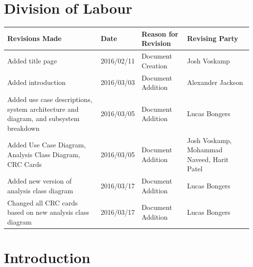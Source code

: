 \documentclass[]{article}
\begin{document}
\section*{Division of Labour}
\label{sec:division_of_labour}
\begin{table}[H]
	\centering
	\begin{tabular}{|p{5cm}|p{2cm}|p{3.5cm}|p{3cm}|}\hline
	    \textbf{Revisions Made} & \textbf{Date} & \textbf{Reason for Revision} & \textbf{Revising Party}\\\hline
		Added title page & 2016/02/11 & Document Creation & Josh Voskamp\\\hline
		Added introduction & 2016/03/03 & Document Addition & Alexander Jackson\\\hline
		Added use case descriptions, system architecture and diagram, and subsystem breakdown & 2016/03/05 & Document Addition & Lucas Bongers\\\hline
		Added Use Case Diagram, Analysis Class Diagram, CRC Cards & 2016/03/05 & Document Addition & Josh Voskamp, \break Mohammad Naveed, \break Harit Patel\\\hline
		Added new version of analysis class diagram & 2016/03/17 & Document Addition & Lucas Bongers\\\hline
		Changed all CRC cards based on new analysis class diagram & 2016/03/17 & Document Addition & Lucas Bongers\\\hline
	\end{tabular}
\end{table}





































\section{Introduction}
\label{sec:introduction}
\end{document}
